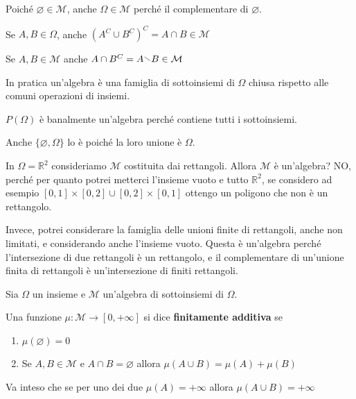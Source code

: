 \begin{remark}
    Poiché \(\varnothing \in \mathcal{M}\), anche \(\Omega \in \mathcal{M}\)
    perché il complementare di \(\varnothing\).
\end{remark}

\begin{remark}
Se \(A, B \in \Omega\), anche \({(A^{C} \cup B^{C})}^{C} = A \cap B \in
\mathcal{M}\) 
\end{remark}

\begin{remark}
    Se \(A, B \in \mathcal{M}\) anche \(A \cap B^{C} = A
    \sminus B \in
    \mathcal{M}\) 
\end{remark}

In pratica un'algebra è una famiglia di sottoinsiemi di \(\Omega\) chiusa
rispetto alle comuni operazioni di insiemi.

\begin{example}
    \(P(\Omega)\) è banalmente un'algebra perché contiene tutti i sottoinsiemi.

    Anche \(\{\varnothing, \Omega\}\) lo è poiché la loro unione è \(\Omega\).
\end{example}

\begin{example}
    In \(\Omega = \mathbb{R}^2\) consideriamo \(\mathcal{M}\) costituita dai
    rettangoli. Allora \(\mathcal{M}\) è un'algebra? NO, perché per quanto
    potrei metterci l'insieme vuoto e tutto \(\mathbb{R}^2\), se considero ad
    esempio \([0, 1] \times [0, 2] \cup [0, 2] \times [0, 1]\) ottengo un
    poligono che non è un rettangolo.

    Invece, potrei considerare la famiglia delle unioni finite di rettangoli,
    anche non limitati, e considerando anche l'insieme vuoto.
    Questa è un'algebra perché l'intersezione di due rettangoli è un rettangolo,
    e il complementare di un'unione finita di rettangoli è un'intersezione di
    finiti rettangoli.
\end{example}

\begin{definition}
     Sia \(\Omega\) un insieme e \(\mathcal{M}\) un'algebra di sottoinsiemi di
     \(\Omega\).

     Una funzione \(\mu : \mathcal{M} \to [0, +\infty]\) si dice
     \textbf{finitamente additiva} se
\begin{enumerate}[label = \arabic*.]
    \item \(\mu(\varnothing) = 0\) 
    \item Se \(A, B \in \mathcal{M}\) e \(A \cap B = \varnothing\) allora
        \(\mu(A \cup B) = \mu(A) + \mu(B)\) 
\end{enumerate}
Va inteso che se per uno dei due \(\mu(A) = +\infty\) allora
\(\mu(A \cup B) = +\infty\) 
\end{definition}


